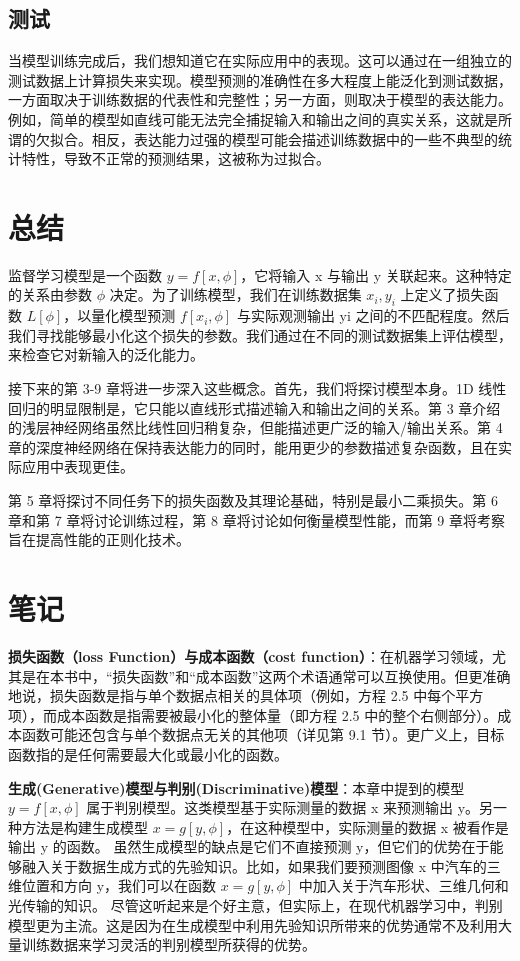 \subsection{测试}

当模型训练完成后，我们想知道它在实际应用中的表现。这可以通过在一组独立的测试数据上计算损失来实现。模型预测的准确性在多大程度上能泛化到测试数据，一方面取决于训练数据的代表性和完整性；另一方面，则取决于模型的表达能力。例如，简单的模型如直线可能无法完全捕捉输入和输出之间的真实关系，这就是所谓的欠拟合。相反，表达能力过强的模型可能会描述训练数据中的一些不典型的统计特性，导致不正常的预测结果，这被称为过拟合。

\section{总结}

监督学习模型是一个函数 $y = f[x, \phi]$，它将输入 x 与输出 y 关联起来。这种特定的关系由参数 \(\phi\) 决定。为了训练模型，我们在训练数据集 {$x_i, y_i$} 上定义了损失函数 $L[\phi]$，以量化模型预测 $f[x_i,\phi]$ 与实际观测输出 yi 之间的不匹配程度。然后我们寻找能够最小化这个损失的参数。我们通过在不同的测试数据集上评估模型，来检查它对新输入的泛化能力。

接下来的第 3-9 章将进一步深入这些概念。首先，我们将探讨模型本身。1D 线性回归的明显限制是，它只能以直线形式描述输入和输出之间的关系。第 3 章介绍的浅层神经网络虽然比线性回归稍复杂，但能描述更广泛的输入/输出关系。第 4 章的深度神经网络在保持表达能力的同时，能用更少的参数描述复杂函数，且在实际应用中表现更佳。

第 5 章将探讨不同任务下的损失函数及其理论基础，特别是最小二乘损失。第 6 章和第 7 章将讨论训练过程，第 8 章将讨论如何衡量模型性能，而第 9 章将考察旨在提高性能的正则化技术。

\section{笔记}

\textbf{损失函数（loss Function）与成本函数（cost function）}：在机器学习领域，尤其是在本书中，“损失函数”和“成本函数”这两个术语通常可以互换使用。但更准确地说，损失函数是指与单个数据点相关的具体项（例如，方程 2.5 中每个平方项），而成本函数是指需要被最小化的整体量（即方程 2.5 中的整个右侧部分）。成本函数可能还包含与单个数据点无关的其他项（详见第 9.1 节）。更广义上，目标函数指的是任何需要最大化或最小化的函数。

\textbf{生成(Generative)模型与判别(Discriminative)模型}：本章中提到的模型 $y = f[x, \phi]$ 属于判别模型。这类模型基于实际测量的数据 x 来预测输出 y。另一种方法是构建生成模型 $x = g[y, \phi]$，在这种模型中，实际测量的数据 x 被看作是输出 y 的函数。
虽然生成模型的缺点是它们不直接预测 y，但它们的优势在于能够融入关于数据生成方式的先验知识。比如，如果我们要预测图像 x 中汽车的三维位置和方向 y，我们可以在函数 $x = g[y, \phi]$ 中加入关于汽车形状、三维几何和光传输的知识。
尽管这听起来是个好主意，但实际上，在现代机器学习中，判别模型更为主流。这是因为在生成模型中利用先验知识所带来的优势通常不及利用大量训练数据来学习灵活的判别模型所获得的优势。


